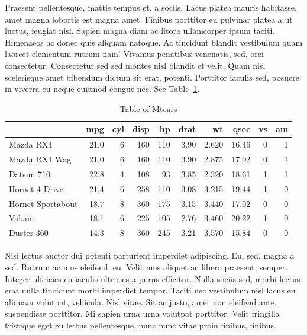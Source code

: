 \documentclass[
  9pt,
  letterpaper,
  DIV=11,
  numbers=noendperiod]{scrartcl}
\begin{document}
Praesent pellentesque, mattis tempus et, a sociis. Lacus platea mauris
habitasse, amet magna lobortis est magna amet. Finibus porttitor eu
pulvinar platea a ut luctus, feugiat nisl. Sapien magna diam ac litora
ullamcorper ipsum taciti. Himenaeos ac donec quis aliquam natoque. Ac
tincidunt blandit vestibulum quam laoreet elementum rutrum nam! Vivamus
penatibus venenatis, sed, orci consectetur. Consectetur sed sed montes
nisl blandit et velit. Quam nisl scelerisque amet bibendum dictum sit
erat, potenti. Porttitor iaculis sed, posuere in viverra eu neque
euismod congue nec. See Table~\ref{tbl-mtcars}.

\hypertarget{tbl-mtcars}{}
\begin{table}
\caption{\label{tbl-mtcars}Table of Mtcars }\tabularnewline

\centering
\begin{tabular}{l|r|r|r|r|r|r|r|r|r}
\hline
  & mpg & cyl & disp & hp & drat & wt & qsec & vs & am\\
\hline
Mazda RX4 & 21.0 & 6 & 160 & 110 & 3.90 & 2.620 & 16.46 & 0 & 1\\
\hline
Mazda RX4 Wag & 21.0 & 6 & 160 & 110 & 3.90 & 2.875 & 17.02 & 0 & 1\\
\hline
Datsun 710 & 22.8 & 4 & 108 & 93 & 3.85 & 2.320 & 18.61 & 1 & 1\\
\hline
Hornet 4 Drive & 21.4 & 6 & 258 & 110 & 3.08 & 3.215 & 19.44 & 1 & 0\\
\hline
Hornet Sportabout & 18.7 & 8 & 360 & 175 & 3.15 & 3.440 & 17.02 & 0 & 0\\
\hline
Valiant & 18.1 & 6 & 225 & 105 & 2.76 & 3.460 & 20.22 & 1 & 0\\
\hline
Duster 360 & 14.3 & 8 & 360 & 245 & 3.21 & 3.570 & 15.84 & 0 & 0\\
\hline
\end{tabular}
\end{table}

Nisi lectus auctor dui potenti parturient imperdiet adipiscing. Eu, sed,
magna a sed. Rutrum ac mus eleifend, eu. Velit mus aliquet ac libero
praesent, semper. Integer ultricies eu iaculis ultricies a purus
efficitur. Nulla sociis sed, morbi lectus erat nulla tincidunt morbi
imperdiet tempor. Taciti nec vestibulum nisl lacus eu aliquam volutpat,
vehicula. Nisl vitae. Sit ac justo, amet non eleifend ante, suspendisse
porttitor. Mi sapien urna urna volutpat porttitor. Velit fringilla
tristique eget eu lectus pellentesque, nunc nunc vitae proin finibus,
finibus.

\newpage{}
\end{document}
